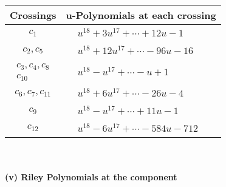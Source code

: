 \documentclass[1p]{elsarticle_modified}
\theoremstyle{definition}
\begin{document}
\begin{tabular}{m{50pt}|m{274pt}}
Crossings & \hspace{64pt}u-Polynomials at each crossing \\
\hline $$\begin{aligned}c_{1}\end{aligned}$$&$\begin{aligned}
&u^{18}+3 u^{17}+\cdots+12 u-1
\end{aligned}$\\
\hline $$\begin{aligned}c_{2},c_{5}\end{aligned}$$&$\begin{aligned}
&u^{18}+12 u^{17}+\cdots-96 u-16
\end{aligned}$\\
\hline $$\begin{aligned}c_{3},c_{4},c_{8}\\c_{10}\end{aligned}$$&$\begin{aligned}
&u^{18}- u^{17}+\cdots- u+1
\end{aligned}$\\
\hline $$\begin{aligned}c_{6},c_{7},c_{11}\end{aligned}$$&$\begin{aligned}
&u^{18}+6 u^{17}+\cdots-26 u-4
\end{aligned}$\\
\hline $$\begin{aligned}c_{9}\end{aligned}$$&$\begin{aligned}
&u^{18}- u^{17}+\cdots+11 u-1
\end{aligned}$\\
\hline $$\begin{aligned}c_{12}\end{aligned}$$&$\begin{aligned}
&u^{18}-6 u^{17}+\cdots-584 u-712
\end{aligned}$\\
\hline
\end{tabular}\\~\\
\newpage\renewcommand{\arraystretch}{1}
\flushleft \textbf{(v) Riley Polynomials at the component}\newline \\
\end{document}
